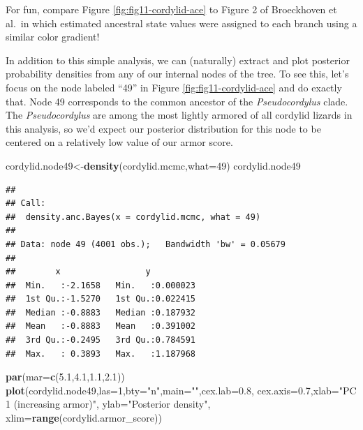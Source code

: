 \documentclass[fleqn,10pt,lineno]{wlpeerj} %
\newenvironment{Shaded}{\begin{snugshade}}{\end{snugshade}}
\newcommand{\AttributeTok}[1]{\textcolor[rgb]{0.13,0.29,0.53}{#1}}
\newcommand{\DecValTok}[1]{\textcolor[rgb]{0.00,0.00,0.81}{#1}}
\newcommand{\FloatTok}[1]{\textcolor[rgb]{0.00,0.00,0.81}{#1}}
\newcommand{\FunctionTok}[1]{\textcolor[rgb]{0.13,0.29,0.53}{\textbf{#1}}}
\newcommand{\NormalTok}[1]{#1}
\newcommand{\OtherTok}[1]{\textcolor[rgb]{0.56,0.35,0.01}{#1}}
\newcommand{\StringTok}[1]{\textcolor[rgb]{0.31,0.60,0.02}{#1}}
\begin{document}
For fun, compare Figure \ref{fig:fig11-cordylid-ace} to Figure 2 of Broeckhoven et al.~in which estimated ancestral state values were assigned to each branch using a similar color gradient!

In addition to this simple analysis, we can (naturally) extract and plot posterior probability densities from any of our internal nodes of the tree. To see this, let's focus on the node labeled ``49'' in Figure \ref{fig:fig11-cordylid-ace} and do exactly that. Node 49 corresponds to the common ancestor of the \emph{Pseudocordylus} clade. The \emph{Pseudocordylus} are among the most lightly armored of all cordylid lizards in this analysis, so we'd expect our posterior distribution for this node to be centered on a relatively low value of our armor score.

\begin{Shaded}
\begin{Highlighting}[]
\NormalTok{cordylid.node49}\OtherTok{\textless{}{-}}\FunctionTok{density}\NormalTok{(cordylid.mcmc,}\AttributeTok{what=}\DecValTok{49}\NormalTok{)}
\NormalTok{cordylid.node49}
\end{Highlighting}
\end{Shaded}

\begin{verbatim}
## 
## Call:
##  density.anc.Bayes(x = cordylid.mcmc, what = 49)
## 
## Data: node 49 (4001 obs.);   Bandwidth 'bw' = 0.05679
## 
##        x                 y           
##  Min.   :-2.1658   Min.   :0.000023  
##  1st Qu.:-1.5270   1st Qu.:0.022415  
##  Median :-0.8883   Median :0.187932  
##  Mean   :-0.8883   Mean   :0.391002  
##  3rd Qu.:-0.2495   3rd Qu.:0.784591  
##  Max.   : 0.3893   Max.   :1.187968
\end{verbatim}

\begin{Shaded}
\begin{Highlighting}[]
\FunctionTok{par}\NormalTok{(}\AttributeTok{mar=}\FunctionTok{c}\NormalTok{(}\FloatTok{5.1}\NormalTok{,}\FloatTok{4.1}\NormalTok{,}\FloatTok{1.1}\NormalTok{,}\FloatTok{2.1}\NormalTok{))}
\FunctionTok{plot}\NormalTok{(cordylid.node49,}\AttributeTok{las=}\DecValTok{1}\NormalTok{,}\AttributeTok{bty=}\StringTok{"n"}\NormalTok{,}\AttributeTok{main=}\StringTok{""}\NormalTok{,}\AttributeTok{cex.lab=}\FloatTok{0.8}\NormalTok{,}
  \AttributeTok{cex.axis=}\FloatTok{0.7}\NormalTok{,}\AttributeTok{xlab=}\StringTok{"PC 1 (increasing armor)"}\NormalTok{,}
  \AttributeTok{ylab=}\StringTok{"Posterior density"}\NormalTok{,}
  \AttributeTok{xlim=}\FunctionTok{range}\NormalTok{(cordylid.armor\_score))}
\end{Highlighting}
\end{Shaded}
\end{document}
